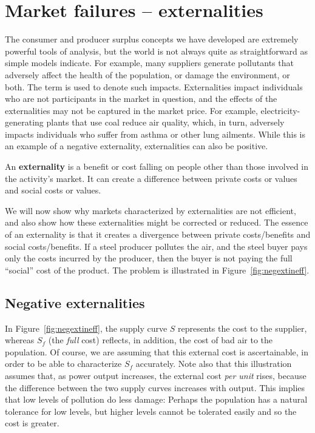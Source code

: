 \section{Market failures -- externalities}\label{sec:ch5sec5}

The consumer and producer surplus concepts we have developed are extremely powerful tools of analysis, but the world is not always quite as straightforward as simple models indicate. For example, many suppliers generate pollutants that adversely affect the health of the population, or damage the environment, or both. The term  is used to denote such impacts. Externalities impact individuals who are not participants in the market in question, and the effects of the externalities may not be captured in the market price. For example, electricity-generating plants that use coal reduce air quality, which, in turn, adversely impacts individuals who suffer from asthma or other lung ailments. While this is an example of a negative externality, externalities can also be positive.

\begin{DefBox}
An \textbf{externality} is a benefit or cost falling on people other than those involved in the activity's market. It can create a difference between private costs or values and social costs or values.
\end{DefBox}

We will now show why markets characterized by externalities are not efficient, and also show how these externalities might be corrected or reduced. The essence of an externality is that it creates a divergence between private costs/benefits and social costs/benefits. If a steel producer pollutes the air, and the steel buyer pays only the costs incurred by the producer, then the buyer is not paying the full ``social'' cost of the product. The problem is illustrated in Figure~\ref{fig:negextineff}.



\subsection*{Negative externalities}

In Figure~\ref{fig:negextineff}, the supply curve $S$ represents the cost to the supplier, whereas $S_f$ (the \textit{full} cost) reflects, in addition, the cost of bad air to the population. Of course, we are assuming that this external cost is ascertainable, in order to be able to characterize $S_f$ accurately. Note also that this illustration assumes that, as power output increases, the external cost \textit{per unit} rises, because the difference between the two supply curves increases with output. This implies that low levels of pollution do less damage: Perhaps the population has a natural tolerance for low levels, but higher levels cannot be tolerated easily and so the cost is greater.

